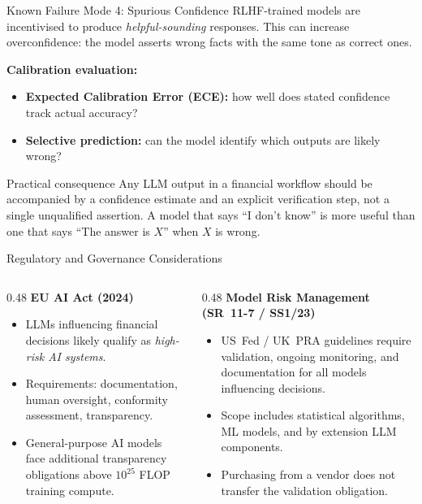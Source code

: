 \documentclass[11pt,aspectratio=169,professionalfonts]{beamer}
\begin{document}
%
%
\begin{frame}{Known Failure Mode 4: Spurious Confidence}
  RLHF-trained models are incentivised to produce
  \emph{helpful-sounding} responses.
  This can increase overconfidence: the model asserts wrong facts with
  the same tone as correct ones.

  \medskip
  \textbf{Calibration evaluation:}
  \begin{itemize}
    \item \textbf{Expected Calibration Error (ECE):} how well does stated
          confidence track actual accuracy?
    \item \textbf{Selective prediction:} can the model identify which
          outputs are likely wrong?
  \end{itemize}

  \begin{block}{Practical consequence}
    Any LLM output in a financial workflow should be accompanied by
    a confidence estimate and an explicit verification step,
    not a single unqualified assertion.
    A model that says ``I don't know'' is more useful than one that
    says ``The answer is $X$'' when $X$ is wrong.
  \end{block}
\end{frame}
%
%
\begin{frame}{Regulatory and Governance Considerations}
  \begin{columns}[T]
    \begin{column}{0.48\linewidth}
      \textbf{EU AI Act (2024)}
      \begin{itemize}
        \item LLMs influencing financial decisions likely qualify as
              \emph{high-risk AI systems}.
        \item Requirements: documentation, human oversight, conformity
              assessment, transparency.
        \item General-purpose AI models face additional transparency
              obligations above $10^{25}$ FLOP training compute.
      \end{itemize}
    \end{column}
    \begin{column}{0.48\linewidth}
      \textbf{Model Risk Management (SR~11-7 / SS1/23)}
      \begin{itemize}
        \item US~Fed / UK~PRA guidelines require validation,
              ongoing monitoring, and documentation for all models
              influencing decisions.
        \item Scope includes statistical algorithms, ML models,
              and by extension LLM components.
        \item Purchasing from a vendor does not transfer the
              validation obligation.
      \end{itemize}
    \end{column}
  \end{columns}
\end{frame}
\end{document}
